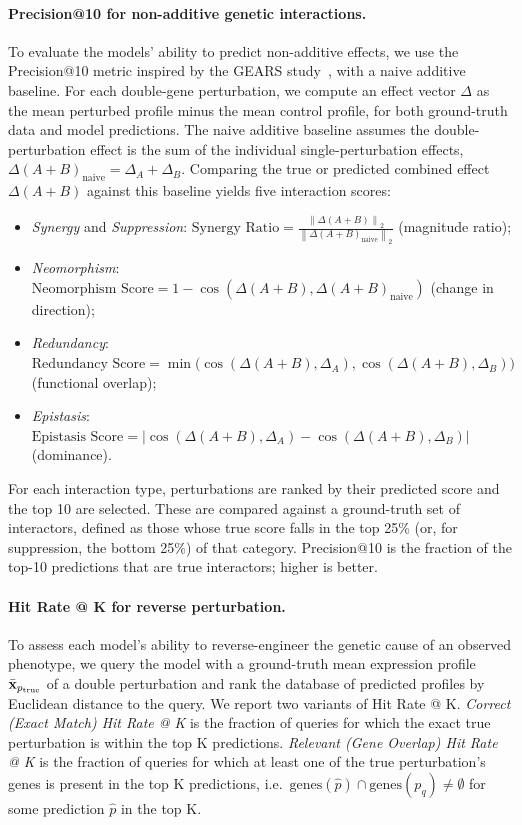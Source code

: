\documentclass[10pt,letterpaper]{article}
\theoremstyle{definition}
\theoremstyle{remark}
\newcommand{\variables}{\rvx}
\newcommand{\effectvector}{\Delta}
\newcommand{\ltwonorm}[1]{\left\lVert #1 \right\rVert_2}
\newcommand{\cossim}[2]{\cos\left(#1, #2\right)}
\newcommand{\meanexpression}{\bar{\variables}}
\newcommand{\effectvectornaive}{\effectvector(A+B)_{\text{naive}}}
\newcommand{\synergyscore}{\text{Synergy Ratio}}
\newcommand{\neomorphismscore}{\text{Neomorphism Score}}
\newcommand{\redundancyscore}{\text{Redundancy Score}}
\newcommand{\epistasiscore}{\text{Epistasis Score}}
\begin{document}
\paragraph{Precision@10 for non-additive genetic interactions.}
To evaluate the models' ability to predict non-additive effects, we use the Precision@10 metric inspired by the GEARS study~\cite{roohani2024predicting}, with a naive additive baseline.
For each double-gene perturbation, we compute an effect vector $\effectvector$ as the mean perturbed profile minus the mean control profile, for both ground-truth data and model predictions.
The naive additive baseline assumes the double-perturbation effect is the sum of the individual single-perturbation effects, $\effectvectornaive = \effectvector_A + \effectvector_B$.
Comparing the true or predicted combined effect $\effectvector(A+B)$ against this baseline yields five interaction scores:
\begin{itemize}
    \item \emph{Synergy} and \emph{Suppression}: $\synergyscore = \frac{\ltwonorm{\effectvector(A+B)}}{\ltwonorm{\effectvectornaive}}$ (magnitude ratio);
    \item \emph{Neomorphism}: $\neomorphismscore = 1 - \cossim{\effectvector(A+B)}{\effectvectornaive}$ (change in direction);
    \item \emph{Redundancy}: $\redundancyscore = \min\bigl(\cossim{\effectvector(A+B)}{\effectvector_A}, \cossim{\effectvector(A+B)}{\effectvector_B}\bigr)$ (functional overlap);
    \item \emph{Epistasis}: $\epistasiscore = \bigl\lvert \cossim{\effectvector(A+B)}{\effectvector_A} - \cossim{\effectvector(A+B)}{\effectvector_B} \bigr\rvert$ (dominance).
\end{itemize}
For each interaction type, perturbations are ranked by their predicted score and the top 10 are selected.
These are compared against a ground-truth set of interactors, defined as those whose true score falls in the top 25\% (or, for suppression, the bottom 25\%) of that category.
Precision@10 is the fraction of the top-10 predictions that are true interactors; higher is better.

\paragraph{Hit Rate @ K for reverse perturbation.}
To assess each model's ability to reverse-engineer the genetic cause of an observed phenotype, we query the model with a ground-truth mean expression profile $\meanexpression_{p_{\text{true}}}$ of a double perturbation and rank the database of predicted profiles by Euclidean distance to the query.
We report two variants of Hit Rate @ K.
\emph{Correct (Exact Match) Hit Rate @ K} is the fraction of queries for which the exact true perturbation is within the top K predictions.
\emph{Relevant (Gene Overlap) Hit Rate @ K} is the fraction of queries for which at least one of the true perturbation's genes is present in the top K predictions, i.e.\ $\text{genes}(\hat{p}) \cap \text{genes}(p_q) \neq \emptyset$ for some prediction $\hat{p}$ in the top K.
\end{document}
